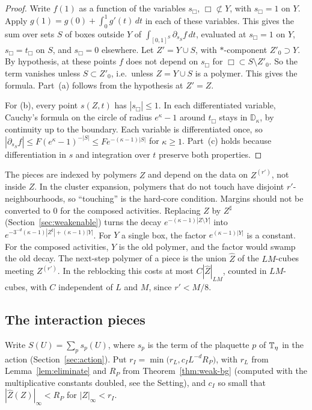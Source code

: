 \begin{proof}
Write $f(1)$ as a function of the variables $s_\Box$, $\Box\not\subset Y$, with $s_\Box=1$ on $Y$. Apply $g(1)=g(0)+\int_0^1g'(t)\,dt$ in each of these variables. This gives the sum over sets $S$ of boxes outside $Y$ of $\int_{[0,1]^S}\partial_{s_S}f\,dt$, evaluated at $s_\Box=1$ on $Y$, $s_\Box=t_\Box$ on $S$, and $s_\Box=0$ elsewhere. Let $Z'=Y\cup S$, with $*$-component $Z'_0\supset Y$. By hypothesis, at these points $f$ does not depend on $s_\Box$ for $\Box\subset S\setminus Z'_0$. So the term vanishes unless $S\subset Z'_0$, i.e.\ unless $Z=Y\cup S$ is a polymer. This gives the formula. Part~(a) follows from the hypothesis at $Z'=Z$.

For (b), every point $s(Z,t)$ has $|s_\Box|\le1$. In each differentiated variable, Cauchy's formula on the circle of radius $e^\kappa-1$ around $t_\Box$ stays in $\mathbb D_\kappa$, by continuity up to the boundary. Each variable is differentiated once, so $|\partial_{s_S}f|\le F(e^\kappa-1)^{-|S|}\le Fe^{-(\kappa-1)|S|}$ for $\kappa\ge1$. Part~(c) holds because differentiation in $s$ and integration over $t$ preserve both properties.
\end{proof}

\begin{remark}[Margins]\label{rem:localization-margins}
The pieces are indexed by polymers $Z$ and depend on the data on $Z^{(r')}$, not inside $Z$. In the cluster expansion, polymers that do not touch have disjoint $r'$-neighbourhoods, so ``touching'' is the hard-core condition. Margins should not be converted to $0$ for the composed activities. Replacing $Z$ by $Z^\sharp$ (Section~\ref{sec:weakenable}) turns the decay $e^{-(\kappa-1)|Z\setminus Y|}$ into $e^{-3^{-d}(\kappa-1)|Z^\sharp|+(\kappa-1)|Y|}$. For $Y$ a single box, the factor $e^{(\kappa-1)|Y|}$ is a constant. For the composed activities, $Y$ is the old polymer, and the factor would swamp the old decay. The next-step polymer of a piece is the union $\hat Z$ of the $LM$-cubes meeting $Z^{(r')}$. In the reblocking this costs at most $C|\hat Z|_{LM}$, counted in $LM$-cubes, with $C$ independent of $L$ and $M$, since $r'<M/8$.
\end{remark}

\subsection{The interaction pieces}\label{subsec:sq-interaction}

Write $S(U)=\sum_ps_p(U)$, where $s_p$ is the term of the plaquette $p$ of $\mathbb T_\eta$ in the action (Section~\ref{sec:action}). Put $r_I=\min\big(r_L,c_IL^{-d}R_P\big)$, with $r_L$ from Lemma~\ref{lem:eliminate} and $R_P$ from Theorem~\ref{thm:weak-bg} (computed with the multiplicative constants doubled, see the Setting), and $c_I$ so small that $|\hat Z(Z)|_\infty<R_P$ for $|Z|_\infty<r_I$.

